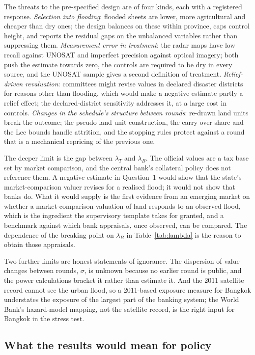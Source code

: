 The threats to the pre-specified design are of four kinds, each with a registered response. \emph{Selection into flooding}: flooded sheets are lower, more agricultural and cheaper than dry ones; the design balances on these within province, caps control height, and reports the residual gaps on the unbalanced variables rather than suppressing them. \emph{Measurement error in treatment}: the radar maps have low recall against UNOSAT and imperfect precision against optical imagery; both push the estimate towards zero, the controls are required to be dry in every source, and the UNOSAT sample gives a second definition of treatment. \emph{Relief-driven revaluation}: committees might revise values in declared disaster districts for reasons other than flooding, which would make a negative estimate partly a relief effect; the declared-district sensitivity addresses it, at a large cost in controls. \emph{Changes in the schedule's structure between rounds}: re-drawn land units break the outcome; the pseudo-land-unit construction, the carry-over share and the Lee bounds handle attrition, and the stopping rules protect against a round that is a mechanical repricing of the previous one.

The deeper limit is the gap between $\lambda_T$ and $\lambda_B$. The official values are a tax base set by market comparison, and the central bank's collateral policy does not reference them. A negative estimate in Question~1 would show that the state's market-comparison valuer revises for a realised flood; it would not show that banks do. What it would supply is the first evidence from an emerging market on whether a market-comparison valuation of land responds to an observed flood, which is the ingredient the supervisory template takes for granted, and a benchmark against which bank appraisals, once observed, can be compared. The dependence of the breaking point on $\lambda_B$ in Table~\ref{tab:lambda} is the reason to obtain those appraisals.

Two further limits are honest statements of ignorance. The dispersion of value changes between rounds, $\sigma$, is unknown because no earlier round is public, and the power calculations bracket it rather than estimate it. And the 2011 satellite record cannot see the urban flood, so a 2011-based exposure measure for Bangkok understates the exposure of the largest part of the banking system; the World Bank's hazard-model mapping, not the satellite record, is the right input for Bangkok in the stress test.

\subsection{What the results would mean for policy}

